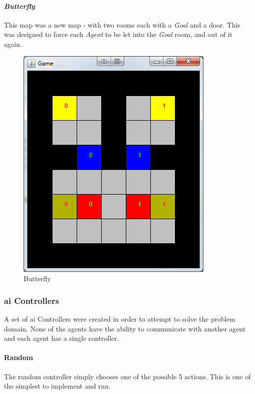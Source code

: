 \documentclass{IEEEtran}
\begin{document}
\paragraph{\emph{Butterfly}} This map was a new map - with two rooms each with a \emph{Goal} and a door. This was designed to force each \emph{Agent} to be let into the \emph{Goal} room, and out of it again.
\begin{figure}[H]
\centering
\includegraphics[scale=0.35]{level6}
\caption{Butterfly}
\label{Butterfly}
\end{figure}


\subsubsection{\gls{ai} Controllers}
A set of \gls{ai} Controllers were created in order to attempt to solve the problem domain. None of the agents have the ability to communicate with another agent and each agent has a single controller.
\paragraph{Random}
The random controller simply chooses one of the possible 5 actions. This is one of the simplest to implement and run.

\end{document}
